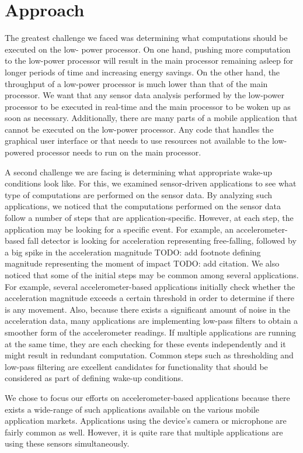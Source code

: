 
\section{Approach}
\label{sec:approach}

The greatest challenge we faced was determining what computations should be executed on the low-
power processor. On one hand, pushing more computation to the low-power processor will result in the
main processor remaining asleep for longer periods of time and increasing energy savings. On the other
hand, the throughput of a low-power processor is much lower than that of the main processor. We want
that any sensor data analysis performed by the low-power processor to be executed in real-time and the
main processor to be woken up as soon as necessary. Additionally, there are many parts of a mobile
application that cannot be executed on the low-power processor. Any code that handles the graphical
user interface or that needs to use resources not available to the low-powered processor needs to run
on the main processor.

A second challenge we are facing is determining what appropriate wake-up conditions look like. For this, we examined sensor-driven applications to see what type of computations are performed on the sensor data. By analyzing such applications, we noticed that the computations performed on the sensor data follow a number of steps that are application-specific. However, at each step, the application may be looking for a specific event. For example, an
accelerometer-based fall detector is looking for acceleration representing free-falling, followed by a big
spike in the acceleration magnitude TODO: add footnote defining magnitude   representing the moment of
impact TODO: add citation. We also noticed that some of the initial steps may be common among several
applications. For example, several accelerometer-based applications initially check whether the
acceleration magnitude exceeds a certain threshold in order to determine if there is any movement.
Also, because there exists a significant amount of noise in the acceleration data, many applications are
implementing low-pass filters to obtain a smoother form of the accelerometer readings. If multiple
applications are running at the same time, they are each checking for these events independently and it
might result in redundant computation. Common steps such as thresholding and low-pass filtering are
excellent candidates for functionality that should be considered as part of defining wake-up conditions.

We chose to focus our efforts on accelerometer-based applications because there exists a wide-range of
such applications available on the various mobile application markets. Applications using the device's
camera or microphone are fairly common as well. However, it is quite rare that multiple applications are
using these sensors simultaneously.
